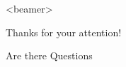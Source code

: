 \documentclass[aspectratio=3218]{beamer}
\begin{document}
\section*{}

\begin{frame}<beamer>{}
	\begin{center}
		Thanks for your attention!
	\end{center}
	\begin{center}
		Are there Questions
	\end{center}
\end{frame}
\end{document}
